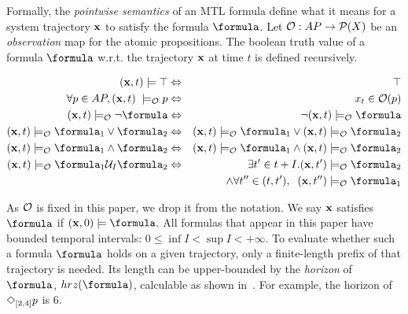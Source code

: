 Formally, the \textit{pointwise semantics} of an MTL formula define what it means for a system trajectory $\mathbf{x}$ to satisfy the formula $\formula$.
Let $\mathcal{O}: AP \rightarrow \mathcal{P}(X)$ be an \textit{observation} map for the atomic propositions.
The boolean truth value of a formula $\formula$ w.r.t. the trajectory $\mathbf{x}$ at time $t$ is defined recursively.
\begin{definition}
	\label{def:boolean sat}
	\begin{eqnarray*}
		\label{eq:boolean sat}
		(\sstraj,t) \models \top &\Leftrightarrow& \top
		\\
		\forall p \in AP, (\sstraj, t) \; \models_\Oc p &\Leftrightarrow& x_t \in \Oc(p)
		\\
		(\sstraj,t) \models_\Oc \neg \formula&\Leftrightarrow& \neg (\sstraj,t) \models_\Oc \formula
		\\
		(\sstraj,t) \models_\Oc \formula_1 \lor \formula_2 &\Leftrightarrow& (\sstraj,t) \models_\Oc \formula_1 \lor (\sstraj,t) \models_\Oc \formula_2
		\\
		(\sstraj,t) \models_\Oc  \formula_1 \land \formula_2&\Leftrightarrow& (\sstraj,t) \models_\Oc \formula_1 \land (\sstraj,t) \models_\Oc \formula_2
		\\
		(\sstraj,t) \models_\Oc \formula_1 \until_I \formula_2 &\Leftrightarrow& \exists t' \in t+I .  (\sstraj,t') \models_\Oc \formula_2  
		\\
		&& \, \land \forall t'' \in (t,t'), \;\; (\sstraj,t'') \models_\Oc \formula_1 
	\end{eqnarray*}
\end{definition}
As $\mathcal{O}$ is fixed in this paper, we drop it from the notation.
We say $\mathbf{x}$ satisfies $\formula$ if $(\sstraj,0) \models \formula$.
All formulas that appear in this paper have bounded temporal intervals: $ 0\leq \inf I < \sup I < +\infty$.
To evaluate whether such a formula $\formula$ holds on a given trajectory, only a finite-length prefix of that trajectory is needed.
Its length can be upper-bounded by the \textit{horizon} of $\formula$, $hrz(\formula)$, calculable as shown in~\cite{Dokhanchi14_OnlineMonitoring}. 
For example, the horizon of $\Diamond_{[2,4]}p$ is 6.

